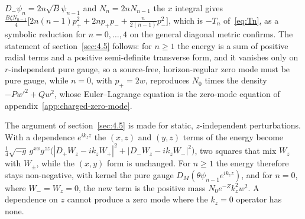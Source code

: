 $D_-\psi_n = 2n\sqrt B\psi_{n-1}$ and $N_n = 2nN_{n-1}$ the $x$ integral
gives $\tfrac{B\zeta N_{n-1}}{4}\big[2n(n-1)p_+^2 + 2np_+p_- + \tfrac{n}{2(n-1)}p_-^2\big]$,
which is $-T_n$ of~\eqref{eq:Tn}, as a symbolic reduction for
$n = 0, \ldots, 4$ on the general diagonal metric confirms.
The statement of section~\ref{sec:4.5} follows: for $n \ge 1$ the energy is a sum of
positive radial terms and a positive semi-definite transverse form, and it
vanishes only on $r$-independent pure gauge, so a source-free, horizon-regular
zero mode must be pure gauge, while $n = 0$, with $p_+ = 2w$, reproduces
$N_0$ times the density $-Pw'^2 + Qw^2$, whose Euler--Lagrange equation
is the zero-mode equation of appendix~\ref{app:charged-zero-mode}.

The argument of section~\ref{sec:4.5} is made for static, $z$-independent
perturbations. With a dependence $e^{ik_zz}$ the $(x,z)$ and $(y,z)$ terms
of the energy become
$\tfrac14\sqrt{-g}\,g^{xx}g^{zz}\big(|D_+W_z - ik_zW_+|^2 + |D_-W_z - ik_zW_-|^2\big)$,
two squares that mix $W_z$ with $W_\pm$, while the $(x,y)$ form is unchanged.
For $n \ge 1$ the energy therefore stays non-negative, with kernel the pure
gauge $D_M(\theta\psi_{n-1}e^{ik_zz})$, and for $n = 0$, where
$W_- = W_z = 0$, the new term is the positive mass $N_0 e^{-Z}k_z^2w^2$.
A dependence on $z$ cannot produce a zero mode where the $k_z = 0$ operator
has none.

